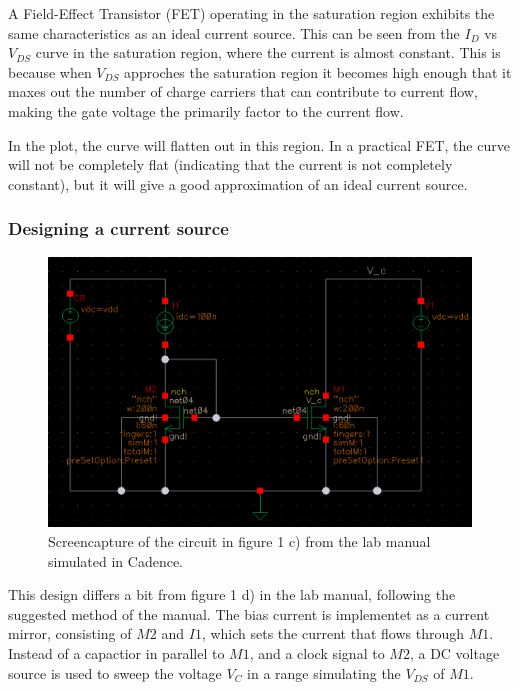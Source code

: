 \documentclass[onecolumn]{article}
\begin{document}
A Field-Effect Transistor (FET) operating in the saturation region exhibits the same characteristics as an ideal current source. This can be seen from the $I_D$ vs $V_{DS}$ curve in the saturation region, where the current is almost constant. This is because when  $V_{DS}$ approches the saturation region it becomes high enough that it maxes out the number of charge carriers that can contribute to current flow, making the gate voltage the primarily factor to the current flow.

In the plot, the curve will flatten out in this region. In a practical FET, the curve will not be completely flat (indicating that the current is not completely constant), but it will give a good approximation of an ideal current source.

 \clearpage

\subsubsection*{Designing a current source}

\begin{figure}[h!]
    \centering
    \includegraphics[width=1\textwidth]{circuit_c_fixed.png}
    \caption{Screencapture of the circuit in figure 1 c) from the lab manual simulated in Cadence.}
    \label{fig:circuitc}
\end{figure}

This design differs a bit from figure 1 d) in the lab manual, following the suggested method of the manual. The bias current is implementet as a current mirror, consisting of $M2$ and $I1$, which sets the current that flows through $M1$. Instead of a capactior in parallel to $M1$, and a clock signal to $M2$, a DC voltage source is used to sweep the voltage $V_C$ in a range simulating the $V_{DS}$ of $M1$. 
\end{document}

